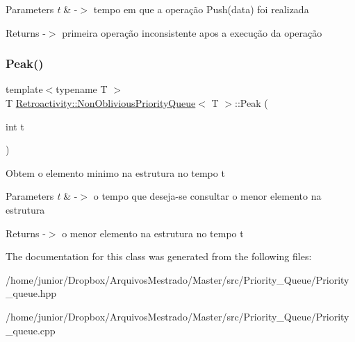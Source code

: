 \begin{DoxyParams}{Parameters}
{\em t} & -\/$>$ tempo em que a operação Push(data) foi realizada \\
\hline
\end{DoxyParams}
\begin{DoxyReturn}{Returns}
-\/$>$ primeira operação inconsistente apos a execução da operação 
\end{DoxyReturn}
\mbox{\label{classRetroactivity_1_1NonObliviousPriorityQueue_ad08c048ac7647ea395654a373b03b3d8}} 
\subsubsection{\texorpdfstring{Peak()}{Peak()}}
{\footnotesize\ttfamily template$<$typename T $>$ \\
T \hyperlink{classRetroactivity_1_1NonObliviousPriorityQueue}{Retroactivity\+::\+Non\+Oblivious\+Priority\+Queue}$<$ T $>$\+::Peak (\begin{DoxyParamCaption}\item[{int}]{t }\end{DoxyParamCaption})}

Obtem o elemento minimo na estrutura no tempo t


\begin{DoxyParams}{Parameters}
{\em t} & -\/$>$ o tempo que deseja-\/se consultar o menor elemento na estrutura \\
\hline
\end{DoxyParams}
\begin{DoxyReturn}{Returns}
-\/$>$ o menor elemento na estrutura no tempo t 
\end{DoxyReturn}


The documentation for this class was generated from the following files\+:\begin{DoxyCompactItemize}
\item 
/home/junior/\+Dropbox/\+Arquivos\+Mestrado/\+Master/src/\+Priority\+\_\+\+Queue/Priority\+\_\+queue.\+hpp\item 
/home/junior/\+Dropbox/\+Arquivos\+Mestrado/\+Master/src/\+Priority\+\_\+\+Queue/Priority\+\_\+queue.\+cpp\end{DoxyCompactItemize}
